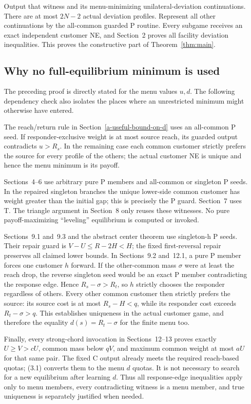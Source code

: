 \documentclass[11pt,a4paper]{article}
\begin{document}
Output that witness and its menu-minimizing unilateral-deviation
continuations. There are at most $2N-2$ actual deviation profiles.
Represent all other continuations by the all-common guarded P routine.
Every subgame receives an exact independent customer NE, and Section~2
proves all facility deviation inequalities. This proves the constructive
part of Theorem~\ref{thm:main}.

\subsection{Why no full-equilibrium minimum is used}
The preceding proof is directly stated for the menu values $u,d$.
The following dependency check also isolates the places where an
unrestricted minimum might otherwise have entered.

The reach/return rule in Section~\ref{a-useful-bound-on-d} uses an
all-common P seed. If responder-exclusive weight is at most source reach,
its guarded output contradicts $u>R_s$. In the remaining case each common
customer strictly prefers the source for every profile of the others;
the actual customer NE is unique and hence the menu minimum is its payoff.

Sections~4--6 use arbitrary pure P members and all-common or singleton
P seeds. In the repaired singleton branches the unique lower-side common
customer has weight greater than the initial gap; this is precisely the
P guard. Section~7 uses T. The triangle argument in Section~8 only reuses
these witnesses. No pure payoff-maximizing ``leveling'' equilibrium is
computed or invoked.

Sections~9.1 and~9.3 and the abstract center theorem use singleton-h P
seeds. Their repair guard is $V-U\le R-2H<H$; the fixed first-reversal
repair preserves all claimed lower bounds. In Sections~9.2 and~12.1,
a pure P member forces one customer $h$ forward. If the other-common mass
$\sigma$ were at least the reach drop, the reverse singleton seed would
be an exact P member contradicting the response edge. Hence
$R_s-\sigma>R_t$, so $h$ strictly chooses the responder regardless of
others. Every other common customer then strictly prefers the source:
its source cost is at most $R_s-H<q$, while its responder cost exceeds
$R_t-\sigma>q$. This establishes uniqueness in the actual customer game,
and therefore the equality $d(s)=R_t-\sigma$ for the finite menu too.

Finally, every strong-chord invocation in Sections~12--13 proves exactly
$U\ge V>cU$, common mass below $qV$, and maximum common weight at most
$aU$ for that same pair. The fixed C output already meets the required
reach-based quotas; (3.1) converts them to the menu $d$ quotas. It is not
necessary to search for a new equilibrium after learning $d$.
Thus all response-edge inequalities apply only to menu members, every
contradicting witness is a menu member, and true uniqueness is separately
justified when needed.
\end{document}
